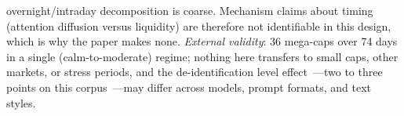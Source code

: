 overnight/intraday decomposition is coarse. Mechanism claims about timing (attention diffusion versus liquidity) are therefore not identifiable in this design, which is why the paper makes none. \emph{External validity}: 36 mega-caps over 74 days in a single (calm-to-moderate) regime; nothing here transfers to small caps, other markets, or stress periods, and the de-identification level effect~---two to three points on this corpus~---may differ across models, prompt formats, and text styles.
